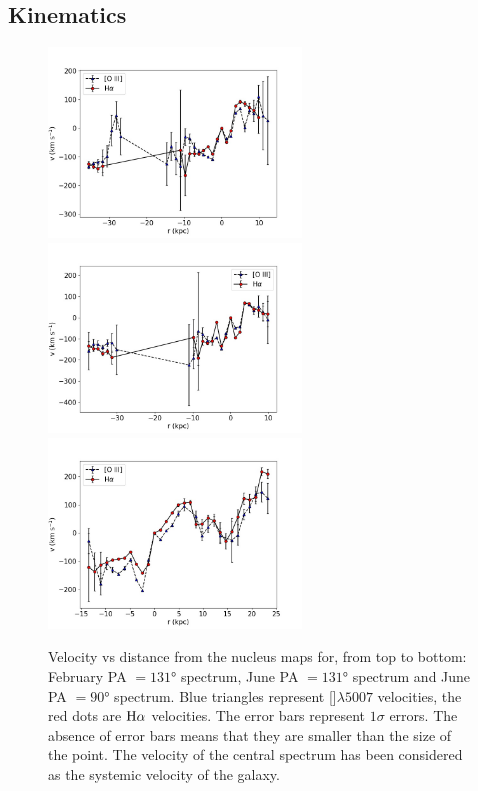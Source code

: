 \documentclass[../main.tex]{subfiles}
\begin{document}
\subsection{Kinematics}
\label{sec:pap3_kinematics}

\begin{figure}
\centering
\includegraphics[width=0.6\textwidth]{images/paper3/PA131_2016_velocity.jpg}\\ 
\includegraphics[width=0.6\textwidth]{images/paper3/PA131_velocity.jpg}\\ 
\includegraphics[width=0.6\textwidth]{images/paper3/PA90_velocity.jpg}\\ 
\caption[]{Velocity vs distance from the nucleus maps for, from top to bottom: February PA $=\ang{131}$ spectrum, June PA $=\ang{131}$ spectrum and June PA $=\ang{90}$ spectrum. Blue triangles represent []$\lambda5007$ velocities, the red dots are $\rm H\alpha$ velocities.
The error bars represent $1\sigma$ errors. The absence of error bars means that they are smaller than the size of the point. The velocity of the central spectrum has been considered as the systemic velocity of the galaxy.} 
\label{fig:velocity_lines}
\end{figure} 
\end{document}
